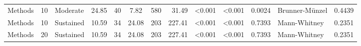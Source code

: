 \begin{table}[H]
{\begin{tabular}{l r p{4cm} c c c c r r r r l r}
Methods & 10 & Moderate &  24.85 & 40 & 7.82 & 580 & 31.49 & \textless 0.001 & \textless 0.001 & 0.0024 &  Brunner-Münzel & 0.4439 \\ 
Methods & 10 & Sustained &  10.59 & 34 & 24.08 & 203 & 227.41 & \textless 0.001 & \textless 0.001 & 0.7393 &  Mann-Whitney & 0.2351 \\ 
Methods & 20 & Sustained &  10.59 & 34 & 24.08 & 203 & 227.41 & \textless 0.001 & \textless 0.001 & 0.7393 &  Mann-Whitney & 0.2351 \\ 
\bottomrule
\end{tabular}%
} 
\label{tab:codebase_graph_latex_repository_graph_component_time_series_statistical_significance_testnormal_previous} 
\end{table}
\newpage 
